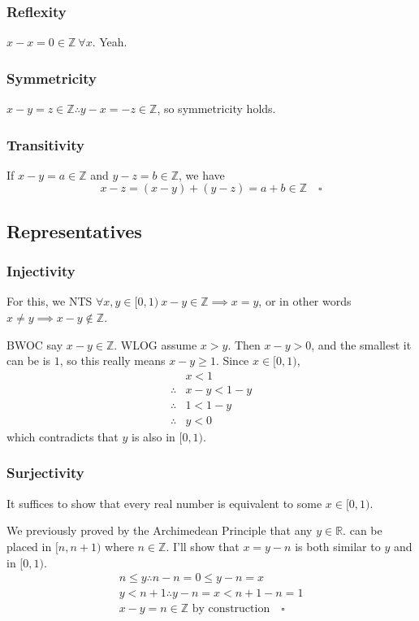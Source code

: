 \documentclass[12pt]{article}
\newcommand{\R}{\mathbb{R}}
\newcommand{\Z}{\mathbb{Z}}
\begin{document}
\subsubsection{Reflexity}

$x-x=0 \in \Z\ \forall x$. Yeah.

\subsubsection{Symmetricity}

$x-y=z \in \Z \therefore y-x=-z \in \Z$, so symmetricity holds.

\subsubsection{Transitivity}

If $x-y=a \in \Z$ and $y-z=b \in \Z$, we have
\[x-z=(x-y)+(y-z)=a+b \in \Z\quad\square\]

\subsection{Representatives}

\subsubsection{Injectivity}

For this, we NTS $\forall x, y \in [0, 1)\ x-y \in \Z \implies x=y$,
or in other words $x \ne y \implies x-y \notin \Z$.

BWOC say $x-y \in \Z$.
WLOG assume $x > y$.
Then $x-y>0$, and the smallest it can be is $1$,
so this really means $x-y \ge 1$.
Since $x \in [0, 1)$,
\begin{align*}
               & x < 1     \\
  \therefore{} & x-y < 1-y \\
  \therefore{} & 1 < 1-y   \\
  \therefore{} & y < 0
\end{align*}
which contradicts that $y$ is also in $[0, 1)$.

\subsubsection{Surjectivity}

It suffices to show that every real number is equivalent to some $x \in [0, 1)$.

We previously proved by the Archimedean Principle that any $y \in \R$.
can be placed in $[n, n+1)$ where $n \in \Z$.
I'll show that $x=y-n$ is both similar to $y$ and in $[0, 1)$.
\begin{gather*}
  n \le y \therefore n-n=0 \le y-n=x \\
  y < n+1 \therefore y-n=x < n+1-n=1 \\
  x-y=n \in \Z\text{ by construction}\quad\square
\end{gather*}
\end{document}
